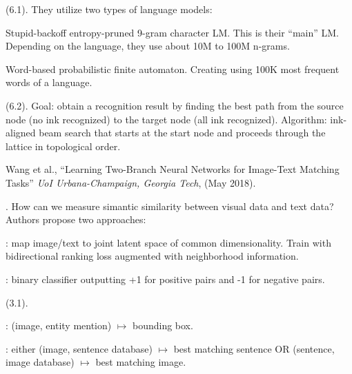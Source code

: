 \documentclass[11pt]{article}
\begin{document}
 (6.1). They utilize two types of language models:
\begin{compactitem}
	\item Stupid-backoff entropy-pruned 9-gram character LM. This is their ``main'' LM. Depending on the language, they use about 10M to 100M n-grams.
	\item Word-based probabilistic finite automaton.  Creating using 100K most frequent words of a language.
\end{compactitem}


 (6.2). Goal: obtain a recognition result by finding the best path from the source node (no ink recognized) to the target node (all ink recognized). Algorithm: ink-aligned beam search that starts at the start node and proceeds through the lattice in topological order. 










\vspace{-1em}
{\footnotesize Wang et al., ``Learning Two-Branch Neural Networks for Image-Text Matching Tasks'' \textit{UoI Urbana-Champaign, Georgia Tech}, (May 2018).}

. How can we measure simantic similarity between visual data and text data? Authors propose two approaches:
\begin{compactitem}
	\item {}: map image/text to joint latent space of common dimensionality. Train with bidirectional ranking loss augmented with neighborhood information. 
	
	\item {}: binary classifier outputting +1 for positive pairs and -1 for negative pairs. 
\end{compactitem}

 (3.1). 
\begin{compactitem}
	\item {}: (image, entity mention) $\mapsto$ bounding box. 
	
	\item {}: either (image, sentence database) $\mapsto$ best matching sentence OR (sentence, image database) $\mapsto$ best matching image.
\end{compactitem}
\end{document}

